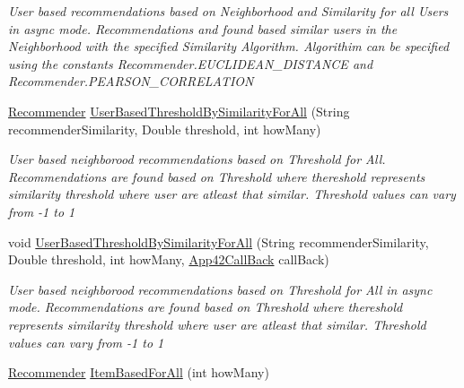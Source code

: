 \begin{DoxyCompactItemize}
\begin{DoxyCompactList}\small\item\em User based recommendations based on Neighborhood and Similarity for all Users in async mode. Recommendations and found based similar users in the Neighborhood with the specified Similarity Algorithm. Algorithim can be specified using the constants Recommender.\+E\+U\+C\+L\+I\+D\+E\+A\+N\+\_\+\+D\+I\+S\+T\+A\+N\+C\+E and Recommender.\+P\+E\+A\+R\+S\+O\+N\+\_\+\+C\+O\+R\+R\+E\+L\+A\+T\+I\+O\+N \end{DoxyCompactList}\item 
\hyperlink{classcom_1_1shephertz_1_1app42_1_1paas_1_1sdk_1_1csharp_1_1recommend_1_1_recommender}{Recommender} \hyperlink{classcom_1_1shephertz_1_1app42_1_1paas_1_1sdk_1_1csharp_1_1recommend_1_1_recommender_service_a30c32d22fdf9b318658e1b7baa0b4e28}{User\+Based\+Threshold\+By\+Similarity\+For\+All} (String recommender\+Similarity, Double threshold, int how\+Many)
\begin{DoxyCompactList}\small\item\em User based neighborood recommendations based on Threshold for All. Recommendations are found based on Threshold where thereshold represents similarity threshold where user are atleast that similar. Threshold values can vary from -\/1 to 1 \end{DoxyCompactList}\item 
void \hyperlink{classcom_1_1shephertz_1_1app42_1_1paas_1_1sdk_1_1csharp_1_1recommend_1_1_recommender_service_aca375e86c9f19b3fb95c2b7c09f655d8}{User\+Based\+Threshold\+By\+Similarity\+For\+All} (String recommender\+Similarity, Double threshold, int how\+Many, \hyperlink{interfacecom_1_1shephertz_1_1app42_1_1paas_1_1sdk_1_1csharp_1_1_app42_call_back}{App42\+Call\+Back} call\+Back)
\begin{DoxyCompactList}\small\item\em User based neighborood recommendations based on Threshold for All in async mode. Recommendations are found based on Threshold where thereshold represents similarity threshold where user are atleast that similar. Threshold values can vary from -\/1 to 1 \end{DoxyCompactList}\item 
\hyperlink{classcom_1_1shephertz_1_1app42_1_1paas_1_1sdk_1_1csharp_1_1recommend_1_1_recommender}{Recommender} \hyperlink{classcom_1_1shephertz_1_1app42_1_1paas_1_1sdk_1_1csharp_1_1recommend_1_1_recommender_service_ae395c91941bbf95536f789f5dfceff84}{Item\+Based\+For\+All} (int how\+Many)

\end{DoxyCompactItemize}
